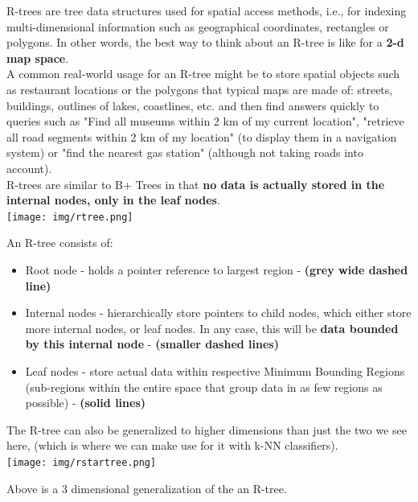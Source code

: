 \documentclass[english, 10pt]{article}
\begin{document}
\begin{tcolorbox}[title=Aside: R-tree,colframe=black,colback=white,arc=0pt,fonttitle=\bfseries,breakable]

R-trees are tree data structures used for spatial access methods, i.e., for indexing multi-dimensional information such as geographical coordinates, rectangles or polygons. In other words, the best way to think about an R-tree is like for a \textbf{2-d map space}.\\

A common real-world usage for an R-tree might be to store spatial objects such as restaurant locations or the polygons that typical maps are made of: streets, buildings, outlines of lakes, coastlines, etc. and then find answers quickly to queries such as "Find all museums within 2 km of my current location", "retrieve all road segments within 2 km of my location" (to display them in a navigation system) or "find the nearest gas station" (although not taking roads into account).\\
 
R-trees are similar to B+ Trees in that {\textbf{no data is actually stored in the internal nodes, only in the leaf nodes}}.\\

\texttt{[image: img/rtree.png]} 

\hfill \break An R-tree consists of:
\begin{itemize}
	\item Root node - holds a pointer reference to largest region - \textbf{(grey  wide dashed line)}
	\item Internal nodes - hierarchically store pointers to child nodes, which either store more internal nodes, or leaf nodes. In any case, this will be \textbf{data bounded by this internal node} - \textbf{(smaller dashed lines)}
	\item Leaf nodes - store actual data within respective Minimum Bounding Regions (sub-regions within the entire space that group data in as few regions as possible) - \textbf{(solid lines)}
\end{itemize}

The R-tree can also be generalized to higher dimensions than just the two we see here, (which is where we can make use for it with k-NN classifiers).\\

\texttt{[image: img/rstartree.png]}

\hfill \break Above is a 3 dimensional generalization of the an R-tree. 

\end{tcolorbox}
\end{document}
